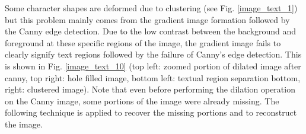 \documentclass[runningheads]{llncs}
\begin{document}
Some character shapes are deformed due to clustering (see Fig. \ref{image_text_1}) but this problem mainly comes from the gradient image formation followed by the Canny edge detection. Due to the low contrast between the background and foreground at these specific regions of the image, the gradient image fails to clearly signify text regions followed by the failure of Canny's edge detection. 
This is shown in Fig.  \ref{image_text_10}  (top left: zoomed portion of dilated image after canny, top right: hole filled image, bottom left: textual region separation bottom, right: clustered image). Note that even before performing the dilation operation on the Canny image, some portions of the image were already missing.  The following technique is applied to recover the missing portions and to reconstruct the image.
\end{document}
